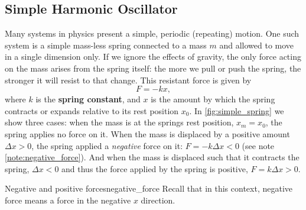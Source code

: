\subsection{Simple Harmonic Oscillator}
Many systems in physics present a simple, periodic (repeating) motion. One such system is a simple mass-less spring connected to a mass $m$ and allowed to move in a single dimension only. If we ignore the effects of gravity, the only force acting on the mass arises from the spring itself: the more we pull or push the spring, the stronger it will resist to that change. This resistant force is given by
\begin{equation}
  F = -kx,
  \label{eq:spring_force}
\end{equation}
where $k$ is the \textbf{spring constant}, and $x$ is the amount by which the spring contracts or expands relative to its rest position $x_{0}$. In \autoref{fig:simple_spring} we show three cases: when the mass is at the springs rest position, $x_{m}=x_{0}$, the spring applies no force on it. When the mass is displaced by a positive amount $\Delta x>0$, the spring applied a \textit{negative} force on it: $F=-k\Delta x<0$ (see note \autoref{note:negative_force}). And when the mass is displaced such that it contracts the spring, $\Delta x<0$ and thus the force applied by the spring is positive, $F=k\Delta x>0$.

\begin{note}{Negative and positive forces}{negative_force}
  Recall that in this context, negative force means a force in the negative $x$ direction.
\end{note}

